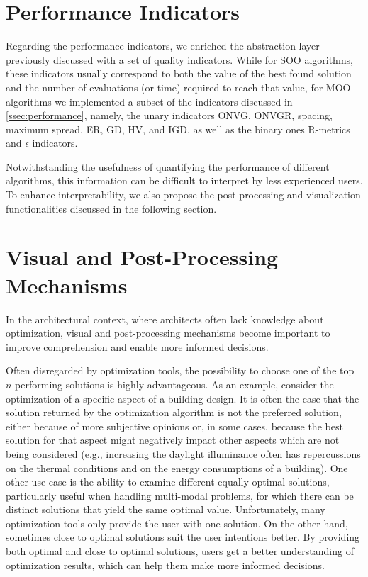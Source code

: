 \section{Performance Indicators}
Regarding the performance indicators, we enriched the abstraction layer previously discussed with a set of quality indicators. While for \ac{SOO} algorithms, these indicators usually correspond to both the value of the best found solution and the number of evaluations (or time) required to reach that value, for \ac{MOO} algorithms we implemented a subset of the indicators discussed in \cref{ssec:performance}, namely, the unary indicators \ac{ONVG}, \ac{ONVGR}, spacing, maximum spread, \ac{ER}, \ac{GD}, \ac{HV}, and \ac{IGD}, as well as the binary ones R-metrics and $\epsilon$ indicators.

Notwithstanding the usefulness of quantifying the performance of different algorithms, this information can be difficult to interpret by less experienced users. To enhance interpretability, we also propose the post-processing and visualization functionalities discussed in the following section.

\section{Visual and Post-Processing Mechanisms}
In the architectural context, where architects often lack knowledge about optimization, visual and post-processing mechanisms become important to improve comprehension and enable more informed decisions. 

Often disregarded by optimization tools, the possibility to choose one of the top $n$ performing solutions is highly advantageous. %
As an example, consider the optimization of a specific aspect of a building design. It is often the case that the solution returned by the optimization algorithm is not the preferred solution, either because of more subjective opinions or, in some cases, because the best solution for that aspect might negatively impact other aspects which are not being considered (e.g., increasing the daylight illuminance often has repercussions on the thermal conditions and on the energy consumptions of a building). One other use case is the ability to examine different equally optimal solutions, particularly useful when handling multi-modal problems, for which there can be distinct solutions that yield the same optimal value. Unfortunately, many optimization tools only provide the user with one solution. On the other hand, sometimes close to optimal solutions suit the user intentions better. By providing both optimal and close to optimal solutions, users get a better understanding of optimization results, which can help them make more informed decisions. 

